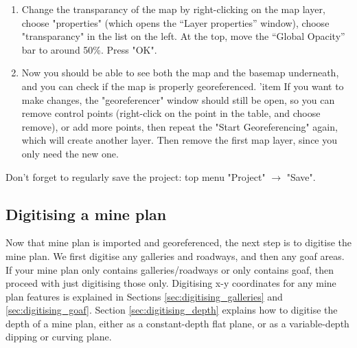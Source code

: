 \begin{enumerate}
    \item Change the transparancy of the map by right-clicking on the map layer, choose "properties" (which opens the “Layer properties” window), choose "transparancy" in the list on the left. At the top, move the “Global Opacity” bar to around 50\%. Press "OK".
    \item Now you should be able to see both the map and the basemap underneath, and you can check if the map is properly georeferenced. 
    'item If you want to make changes, the "georeferencer" window should still be open, so you can remove control points (right-click on the point in the table, and choose remove), or add more points, then repeat the "Start Georeferencing" again, which will create another layer. Then remove the first map layer, since you only need the new one. 
\end{enumerate}
Don’t forget to regularly save the project: top menu "Project" $\rightarrow$ "Save".

\subsection{Digitising a mine plan}
Now that mine plan is imported and georeferenced, the next step is to digitise the mine plan. We first digitise any galleries and roadways, and then any goaf areas. If your mine plan only contains galleries/roadways or only contains goaf, then proceed with just digitising those only. Digitising x-y coordinates for any mine plan features is explained in Sections \ref{sec:digitising_galleries} and \ref{sec:digitising_goaf}. Section \ref{sec:digitising_depth} explains how to digitise the depth of a mine plan, either as a constant-depth flat plane, or as a variable-depth dipping or curving plane.


